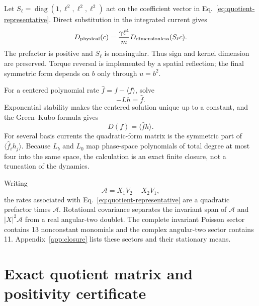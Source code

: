 \documentclass[aps,pre,reprint,amsmath,amssymb,superscriptaddress,nofootinbib]{revtex4-2}
\newcommand{\cA}{\mathcal{A}}
\begin{document}
Let $S_\ell=\operatorname{diag}(1,\ell^2,\ell^2,\ell^2)$ act on the
coefficient vector in Eq.~\eqref{eq:quotient-representative}.  Direct
substitution in the integrated current gives
\begin{equation}
 D_{\rm physical}(c)=\frac{\gamma\ell^4}{m}
 D_{\rm dimensionless}(S_\ell c).
\label{eq:physical-scaling}
\end{equation}
The prefactor is positive and $S_\ell$ is nonsingular.  Thus sign and kernel
dimension are preserved.  Torque reversal is implemented by a spatial
reflection; the final symmetric form depends on $b$ only through $u=b^2$.

For a centered polynomial rate
$\widehat f=f-\langle f\rangle$, solve
\begin{equation}
 -Lh=\widehat f.
\label{eq:poisson}
\end{equation}
Exponential stability makes the centered solution unique up to a constant,
and the Green--Kubo formula gives
\begin{equation}
 D(f)=\langle \widehat f h\rangle.
\label{eq:green-kubo}
\end{equation}
For several basis currents the quadratic-form matrix is the symmetric part of
$\langle\widehat f_i h_j\rangle$.  Because $L_b$ and $L_0$ map
phase-space polynomials of total degree at most four into the same space, the
calculation is an exact finite closure, not a truncation of the dynamics.

Writing
\begin{equation}
 \cA=X_1V_2-X_2V_1,
\end{equation}
the rates associated with Eq.~\eqref{eq:quotient-representative} are a
quadratic prefactor times $\cA$.  Rotational covariance separates the
invariant span of $\cA$ and $|X|^2\cA$ from a real angular-two doublet.
The complete invariant Poisson sector contains 13 nonconstant monomials and
the complex angular-two sector contains 11.  Appendix~\ref{app:closure} lists
these sectors and their stationary means.

\section{Exact quotient matrix and positivity certificate}
\label{sec:certificate}
\end{document}
